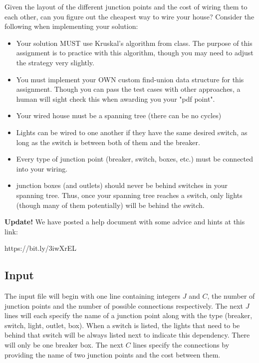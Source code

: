 \documentclass[11pt]{article}
\begin{document}
Given the layout of the different junction points and the cost of wiring them to each other, can you figure out the cheapest way to wire your house? Consider the following when implementing your solution:

\begin{itemize}
	\item Your solution MUST use Kruskal's algorithm from class. The purpose of this assignment is to practice with this algorithm, though you may need to adjust the strategy very slightly.
	\item You must implement your OWN custom find-union data structure for this assignment. Though you can pass the test cases with other approaches, a human will sight check this when awarding you your "pdf point".
	\item Your wired house must be a spanning tree (there can be no cycles)
	\item Lights can be wired to one another if they have the same desired switch, as long as the switch is between both of them and the breaker.
	\item Every type of junction point (breaker, switch, boxes, etc.) must be connected into your wiring. 
	\item junction boxes (and outlets) should never be behind switches in your spanning tree. Thus, once your spanning tree reaches a switch, only lights (though many of them potentially) will be behind the switch.
\end{itemize}

{\bf Update!}  We have posted a help document with some advice and hints at this link: \\
\begin{verb}
https://bit.ly/3iwXrEL
\end{verb}

\subsection*{Input}
The input file will begin with one line containing integers $J$ and $C$, the number of junction points and the number of possible connections respectively. The next $J$ lines will each specify the name of a junction point along with the type (breaker, switch, light, outlet, box). When a switch is listed, the lights that need to be behind that switch will be always listed next to indicate this dependency. There will only be one breaker box. The next $C$ lines specify the connections by providing the name of two junction points and the cost between them.
\end{document}

